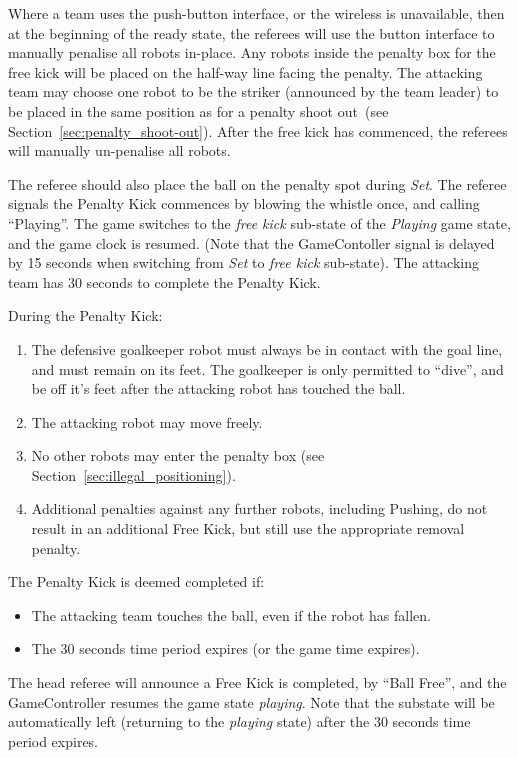 \documentclass[12pt]{article}
\newcommand{\cf}{see\xspace}
\newcommand{\PlayingDelayTime}{15 seconds\xspace}
\newcommand{\PenaltyFreeKickTime}{30 seconds\xspace}
\begin{document}
Where a team uses the push-button interface, or the wireless is unavailable, then at the beginning of the ready state, the referees will use the button interface to manually penalise all robots in-place.
Any robots inside the penalty box for the free kick will be placed on the half-way line facing the penalty.
The attacking team may choose one robot to be the striker (announced by the team leader) to be placed in the same position as for a penalty shoot out~(\cf Section~\ref{sec:penalty_shoot-out}).
After the free kick has commenced, the referees will manually un-penalise all robots.

The referee should also place the ball on the penalty spot during \textit{Set}.
The referee signals the Penalty Kick commences by blowing the whistle once, and calling ``Playing''. 
The game switches to the \textit{free kick} sub-state of the \textit{Playing} game state, and the game clock is resumed.
(Note that the GameContoller signal is delayed by \PlayingDelayTime when switching from \textit{Set} to \textit{free kick} sub-state).
The attacking team has \PenaltyFreeKickTime to complete the Penalty Kick.

During the Penalty Kick:
\begin{enumerate}
    \item The defensive goalkeeper robot must always be in contact with the goal line, and must remain on its feet. The goalkeeper is only permitted to ``dive'', and be off it's feet after the attacking robot has touched the ball.
    \item The attacking robot may move freely.
    \item No other robots may enter the penalty box (\cf Section~\ref{sec:illegal_positioning}).
    \item Additional penalties against any further robots, including Pushing, do not result in an additional Free
    Kick, but still use the appropriate removal penalty.
\end{enumerate}

The Penalty Kick is deemed completed if:
\begin{itemize}
\item The attacking team touches the ball, even if the robot has fallen.
\item The \PenaltyFreeKickTime time period expires (or the game time expires).
\end{itemize}

The head referee will announce a Free Kick is completed, by ``Ball Free'', and the GameController
resumes the game state \emph{playing}. Note that the substate will be automatically left (returning to the \textit{playing} state) after the \PenaltyFreeKickTime time period expires.
\end{document}
